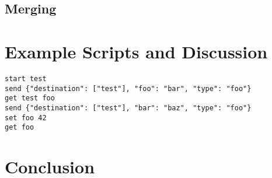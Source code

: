 \documentclass[11pt]{article}
\begin{document}
\subsection{Merging}\label{sec:Merg}

\section{Example Scripts and Discussion}\label{sec:Ex}

\begin{lstlisting}[language={}, caption={Example Script 1}, basicstyle=\ttfamily]
start test
send {"destination": ["test"], "foo": "bar", "type": "foo"}
get test foo
send {"destination": ["test"], "bar": "baz", "type": "foo"}
set foo 42
get foo
\end{lstlisting}

\section{Conclusion}\label{sec:Conc}

\clearpage

\printbibliography
\end{document}
